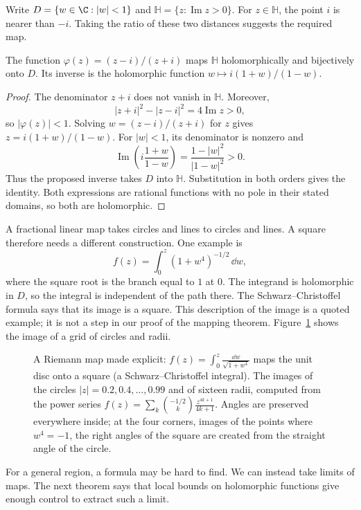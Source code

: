 Write $D=\{w\in\C:|w|<1\}$ and $\mathbb H=\{z:\operatorname{Im}z>0\}$.
For $z\in\mathbb H$, the point $i$ is nearer than $-i$. Taking the ratio
of these two distances suggests the required map.

\begin{lemma}\label{lem:cayley}
The function $\varphi(z)=(z-i)/(z+i)$ maps $\mathbb H$ holomorphically and
bijectively onto $D$. Its inverse is the holomorphic function
$w\mapsto i(1+w)/(1-w)$.
\end{lemma}
\begin{proof}
The denominator $z+i$ does not vanish in $\mathbb H$. Moreover,
\[
 |z+i|^2-|z-i|^2=4\operatorname{Im}z>0,
\]
so $|\varphi(z)|<1$. Solving $w=(z-i)/(z+i)$ for $z$ gives
$z=i(1+w)/(1-w)$. For $|w|<1$, its denominator is nonzero and
\[
 \operatorname{Im}\left(i\frac{1+w}{1-w}\right)
 =\frac{1-|w|^2}{|1-w|^2}>0.
\]
Thus the proposed inverse takes $D$ into $\mathbb H$. Substitution in both
orders gives the identity. Both expressions are rational functions with no
pole in their stated domains, so both are holomorphic.
\end{proof}

A fractional linear map takes circles and lines to circles and lines.
A square therefore needs a different construction. One example is
\[
 f(z)=\int_0^z(1+w^4)^{-1/2}\,\dd w,
\]
where the square root is the branch equal to $1$ at $0$.
The integrand is holomorphic in $D$, so the integral is independent of the
path there. The Schwarz--Christoffel formula says that its image is a square.
This description of the image is a quoted example; it is not a step in our
proof of the mapping theorem. Figure~\ref{fig:squaremap} shows the image of
a grid of circles and radii.

\begin{figure}[ht]
\centering
{}
\caption{A Riemann map made explicit: $f(z)=\int_0^z\frac{\dd w}{\sqrt{1+w^4}}$ maps the unit disc onto a square (a Schwarz--Christoffel integral). The images of the circles $|z|=0.2,0.4,\dots,0.99$ and of
sixteen radii, computed from the power series $f(z)=\sum_k\binom{-1/2}k\frac{z^{4k+1}}{4k+1}$. Angles are preserved everywhere inside; at the four corners, images of the points where $w^4=-1$, the right
angles of the square are created from the straight angle of the circle.}
\label{fig:squaremap}
\end{figure}

For a general region, a formula may be hard to find. We can instead take
limits of maps. The next theorem says that local bounds on holomorphic
functions give enough control to extract such a limit.

